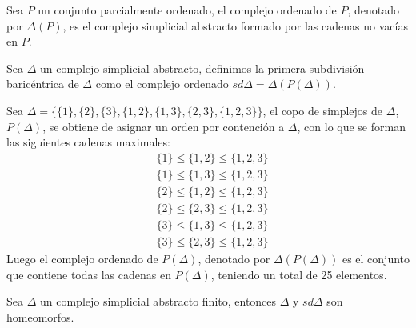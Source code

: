 \begin{Defi}
Sea $P$ un conjunto parcialmente ordenado, el complejo ordenado de $P$, denotado por $\Delta(P)$, es el complejo simplicial abstracto formado por las cadenas no vacías en $P$.
\end{Defi}
\begin{Defi}
Sea $\Delta$ un complejo simplicial abstracto, definimos la primera subdivisión baricéntrica de $\Delta$ como el complejo ordenado $sd\Delta = \Delta(P(\Delta))$.
\end{Defi}
\begin{Ejem}
Sea $\Delta = \{\{1\},\{2\},\{3\},\{1,2\},\{1,3\},\{2,3\},\{1,2,3\}\}$, el copo de simplejos de $\Delta$, $P(\Delta)$, se obtiene de asignar un orden por contención a $\Delta$, con lo que se forman las siguientes cadenas maximales:
\begin{align*}
&\{1\}\leq\{1,2\}\leq\{1,2,3\}\\
&\{1\}\leq\{1,3\}\leq\{1,2,3\}\\
&\{2\}\leq\{1,2\}\leq\{1,2,3\}\\
&\{2\}\leq\{2,3\}\leq\{1,2,3\}\\
&\{3\}\leq\{1,3\}\leq\{1,2,3\}\\
&\{3\}\leq\{2,3\}\leq\{1,2,3\}
\end{align*}
Luego el complejo ordenado de $P(\Delta)$, denotado por $\Delta(P(\Delta))$ es el conjunto que contiene todas las cadenas en $P(\Delta)$, teniendo un total de 25 elementos.
\end{Ejem}



\begin{Teo}
Sea $\Delta$ un complejo simplicial abstracto finito, entonces $\Delta$ y $sd\Delta$ son homeomorfos.
\end{Teo}

